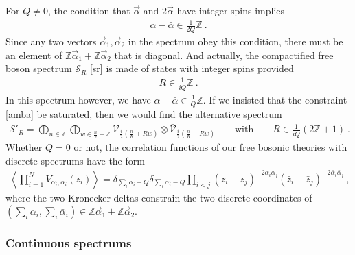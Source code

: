\documentclass[12pt, a4paper, notitlepage, twoside]{report}
\numberwithin{equation}{section}
\theoremstyle{break}
\begin{document}
For $Q\neq 0$, the condition that $\vec\alpha$ and $2\vec\alpha$ have integer spins implies 
\begin{align}
 \alpha-\bar\alpha\in \frac{1}{2Q}\mathbb{Z}\ .
 \label{amba}
\end{align}
Since any two vectors $\vec\alpha_1,\vec\alpha_2$ in the spectrum obey this condition, there must be an element of $\mathbb{Z}\vec\alpha_1 + \mathbb{Z}\vec\alpha_2$ that is diagonal. And actually, the compactified free boson spectrum $\mathcal{S}_R$ \eqref{sr} is made of states with integer spins provided
\begin{align}
 R \in \frac{1}{iQ}\mathbb{Z}\ .
 \label{riqz}
\end{align}
In this spectrum however, we have $\alpha-\bar\alpha\in\frac{1}{Q}\mathbb{Z}$. 
If we insisted that the constraint \eqref{amba} be saturated, then we would find the alternative spectrum
\begin{align}
 \mathcal{S}'_R = \bigoplus_{n\in \mathbb{Z}} \bigoplus_{w\in \frac{n}{2}+\mathbb{Z}} \mathcal{V}_{\frac{i}{2}\left(\frac{n}{R} + Rw\right)} \otimes \bar{\mathcal{V}}_{\frac{i}{2}\left(\frac{n}{R} - Rw\right)} \qquad \text{with}\qquad R \in \frac{1}{iQ}(2\mathbb{Z}+1)\ .
\end{align}
Whether $Q=0$ or not, the correlation functions of our free bosonic theories with discrete spectrums have the form
\begin{align}
 \left\langle \prod_{i=1}^N V_{\alpha_i,\bar\alpha_i}(z_i) \right\rangle = 
 \delta_{\sum_i \alpha_i-Q} \delta_{\sum_i\bar\alpha_i-Q} 
 \prod_{i<j} (z_i-z_j)^{-2\alpha_i\alpha_j}(\bar{z}_i-\bar{z}_j)^{-2\bar{\alpha}_i\bar{\alpha}_j}\ , 
\end{align}
where the two Kronecker deltas constrain the two discrete coordinates of $(\sum_i\alpha_i,\sum_i\bar\alpha_i)\in \mathbb{Z}\vec\alpha_1 + \mathbb{Z}\vec\alpha_2$.

\subsubsection{Continuous spectrums}
\end{document}
